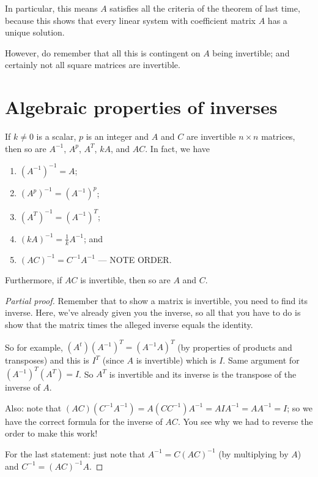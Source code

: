 In particular, this means $A$ satisfies all the criteria of the 
theorem of last time, because this shows that every linear
system with coefficient matrix $A$ has a unique solution.

However, do remember that all this is contingent on $A$ being
invertible; and certainly not all square matrices are invertible.

\section{Algebraic properties of inverses}

\begin{proposition} 

If $k \neq 0$ is a scalar, $p$ is an integer and $A$ and $C$ are invertible $n \times n$
matrices, then so are $A^{-1}$, $A^p$, $A^T$, $kA$, and $AC$. In fact, we have 
\begin{enumerate}[(1)]
\item $(A^{-1})^{-1} = A$;
\item $(A^p)^{-1} = (A^{-1})^p$;
\item  $(A^T)^{-1} = (A^{-1})^T$;
\item $(kA)^{-1} = \frac{1}{k} A^{-1}$; and
\item $(AC)^{-1} = C^{-1}A^{-1}$ --- NOTE ORDER.
\end{enumerate}
Furthermore, if $AC$ is invertible, then so are $A$ and $C$.
\end{proposition}

\begin{proof}[Partial proof]
Remember that to show a matrix is invertible, you need to find its
inverse.  Here, we've already given you the inverse, so all that
you have to do is show that the matrix times the alleged inverse
equals the identity.  

So for example, $(A^t) (A^{-1})^T = (A^{-1}A)^T$ (by properties of
products and transposes) and this is $I^T$ (since $A$ is invertible)
which is $I$.  Same argument for $(A^{-1})^T (A^T) =I$.  So $A^T$
is invertible and its inverse is the transpose of the inverse of $A$.

Also:  note that $(AC) (C^{-1}A^{-1}) = A (CC^{-1}) A^{-1} = AIA^{-1} = AA^{-1} = I$; so we have the correct formula for the inverse of $AC$.  You see why
we had to reverse the order to make this work!

For the last statement:  just note that $A^{-1} = C(AC)^{-1}$ (by
multiplying by $A$) and $C^{-1} = (AC)^{-1} A$.
\end{proof}

